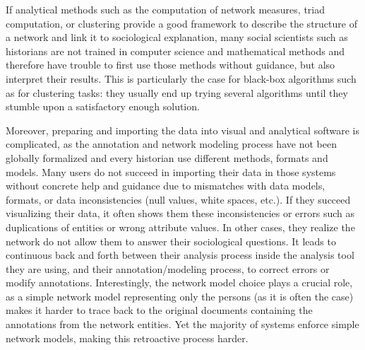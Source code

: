 If analytical methods such as the computation of network measures, triad computation, or clustering provide a good framework to describe the structure of a network and link it to sociological explanation\cite{wassermanSocialNetworkAnalysis1994, scottSocialNetworkAnalysis1988}, many social scientists such as historians are not trained in computer science and mathematical methods and therefore have trouble to first use those methods without guidance, but also interpret their results.
This is particularly the case for black-box algorithms such as for clustering tasks: they usually end up trying several algorithms until they stumble upon a satisfactory enough solution\cite{pisterIntegratingPriorKnowledge2021}.



Moreover, preparing and importing the data into visual and analytical software is complicated, as the annotation and network modeling process have not been globally formalized and every historian use different methods, formats and models.
Many users do not succeed in importing their data in those systems without concrete help and guidance\cite{serranomolineroUnderstandingUseVistorian2017, alkadi2022} due to mismatches with data models, formats, or data inconsistencies (null values, white spaces, etc.).
If they succeed visualizing their data, it often shows them these inconsistencies or errors such as duplications of entities or wrong attribute values.
In other cases, they realize the network do not allow them to answer their sociological questions\cite{lemercier12FormalNetwork2015}.
It leads to continuous back and forth between their analysis process inside the analysis tool they are using, and their annotation/modeling process, to correct errors or modify annotations.
Interestingly, the network model choice plays a crucial role, as a simple network model representing only the persons (as it is often the case) makes it harder to trace back to the original documents containing the annotations from the network entities.
Yet the majority of \sna systems enforce simple network models, making this retroactive process harder.

